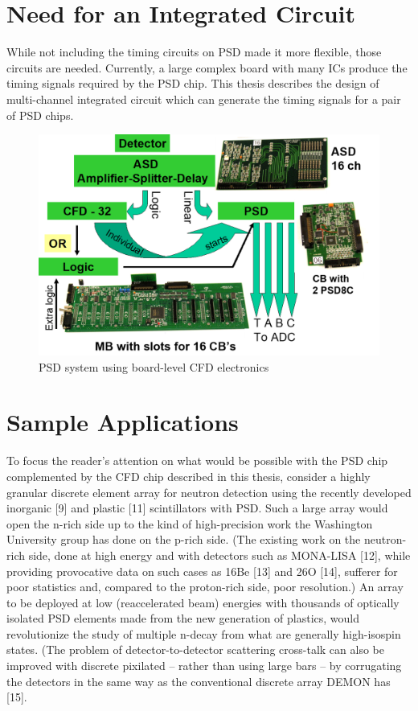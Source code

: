 \documentclass[12pt,oneside,final]{siuethesis}
\theoremstyle{definition}
\begin{document}
\section{Need for an Integrated Circuit}

While not including the timing circuits on PSD made it more flexible, those circuits are needed.  Currently, a large complex board with many ICs produce the timing signals required by the PSD chip. This thesis describes the design of multi-channel integrated circuit which can generate the timing signals for a pair of PSD chips.

\begin{figure}[htbp!]
	\centering
 	\includegraphics[scale=0.8,keepaspectratio=true]{./ch1_figures/PSD_system.png}
 	\caption{PSD system using board-level CFD electronics}
 	\label{FIG:PSD_SYSTEM}
\end{figure}



\section{Sample Applications}

To focus the reader’s attention on what would be possible with the PSD chip complemented by the CFD chip described in this thesis, consider a highly granular discrete element array for neutron detection using the recently developed inorganic [9] and plastic [11] scintillators with PSD. Such a large array would open the n-rich side up to the kind of high-precision work the Washington University group has done on the p-rich side. (The existing work on the neutron-rich side, done at high energy and with detectors such as MONA-LISA [12], while providing provocative data on such cases as 16Be [13] and 26O [14], sufferer for poor statistics and, compared to the proton-rich side, poor resolution.) An array to be deployed at low (reaccelerated beam) energies with thousands of optically isolated PSD elements made from the new generation of plastics, would revolutionize the study of multiple n-decay from what are generally high-isospin states. (The problem of detector-to-detector scattering cross-talk can also be improved with discrete pixilated – rather than using large bars – by corrugating the detectors in the same way as the conventional discrete array DEMON has [15].  
\end{document}
